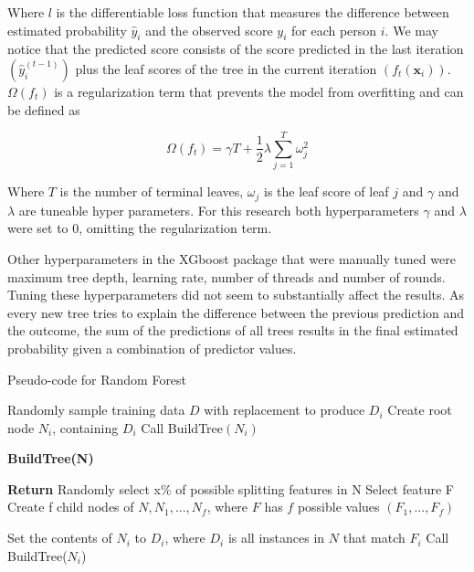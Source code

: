 \documentclass[AMA,STIX1COL, table]{WileyNJD-v2}
\begin{document}
Where $l$ is the differentiable loss function that measures the difference between estimated probability $\hat{y}_i$ and the observed score $y_i$ for each person $i$. We may notice that the predicted score consists of the score predicted in the last iteration $(\hat{y}_i^{(t-1)})$ plus the leaf scores of the tree in the current iteration $(f_t(\mathbf x_i))$. $\Omega(f_t)$ is a regularization term that prevents the model from overfitting and can be defined as 

\begin{equation*}
\label{xg_regularization}
\Omega(f_t) = \gamma T + \frac{1}{2} \lambda \sum_{j = 1}^T \omega_j^2
\end{equation*}

Where $T$ is the number of terminal leaves, $\omega_j$ is the leaf score of leaf $j$ and $\gamma$ and $\lambda$ are tuneable hyper parameters. For this research both hyperparameters $\gamma$ and $\lambda$ were set to 0, omitting the regularization term. 

Other hyperparameters in the XGboost package that were manually tuned were maximum tree depth, learning rate, number of threads and number of rounds. Tuning these hyperparameters did not seem to substantially affect the results. As every new tree tries to explain the difference between the previous prediction and the outcome, the sum of the predictions of all trees results in the final estimated probability given a combination of predictor values.

\FloatBarrier
\begin{algorithm}[hbt!]
\caption{Pseudo-code for Random Forest \cite{Guo2019}} \label{algRF}
\begin{algorithmic}

    \State Randomly sample training data $D$ with replacement to produce $D_i$
    \State Create root node $N_i$, containing $D_i$
    \State Call BuildTree$(N_i)$
   
  \EndFor
  
\textbf{BuildTree(N)}
 
        \State \textbf{Return}
    \Else
        \State Randomly  select x\% of possible splitting features in N
        \State Select feature F
        \State Create f child nodes of $N, N_1, ..., N_f$, where $F$ has $f$ possible values $(F_1, ..., F_f)$
   
   
     \State Set the contents of $N_i$ to $D_i$, where $D_i$ is all instances in $N$ that match $F_i$
     \State Call BuildTree($N_i$)
   \EndFor
   \EndIf
   
\end{algorithmic}
\end{algorithm}
\FloatBarrier
\end{document}
